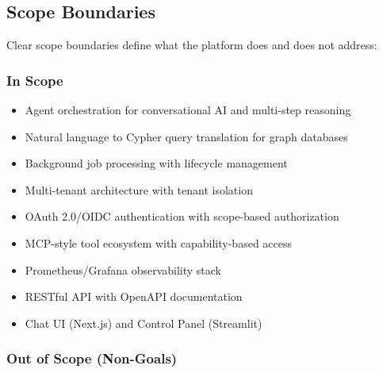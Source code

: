 \documentclass[a4paper,twoside]{sapthesis}
\begin{document}
\subsection{Scope Boundaries}
\label{subsec:scope-boundaries}

Clear scope boundaries define what the platform does and does not address:

\subsubsection{In Scope}

\begin{itemize}
    \item Agent orchestration for conversational AI and multi-step reasoning
    \item Natural language to Cypher query translation for graph databases
    \item Background job processing with lifecycle management
    \item Multi-tenant architecture with tenant isolation
    \item OAuth 2.0/OIDC authentication with scope-based authorization
    \item MCP-style tool ecosystem with capability-based access
    \item Prometheus/Grafana observability stack
    \item RESTful API with OpenAPI documentation
    \item Chat UI (Next.js) and Control Panel (Streamlit)
\end{itemize}

\subsubsection{Out of Scope (Non-Goals)}
\end{document}
